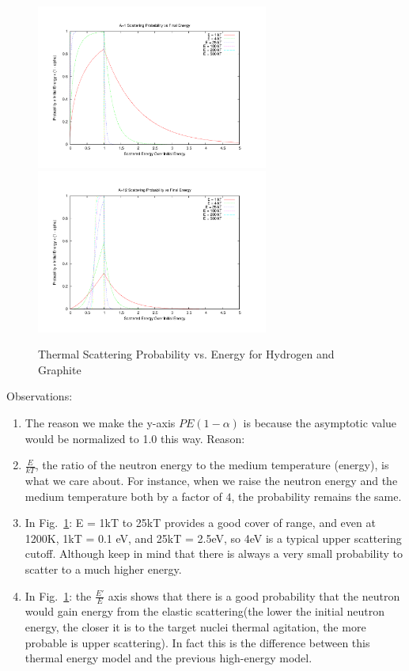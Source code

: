 \documentclass{school-22.211-notes}
\begin{document}
\begin{enumerate}
\begin{figure}[ht]
  \centering
  \includegraphics[width=3in]{images/sl-d/ts_H.uncrop.pdf}
  \includegraphics[width=3in]{images/sl-d/ts_C.uncrop.pdf}
  \caption{Thermal Scattering Probability vs. Energy for Hydrogen and Graphite} \label{ts-C-H}
\end{figure}
Observations: 
\begin{enumerate}
\item The reason we make the y-axis $P E (1-\alpha)$ is because the asymptotic value would be normalized to 1.0 this way. Reason: 

\item $\displaystyle \frac{E}{kT}$, the ratio of the neutron energy to the medium temperature (energy), is what we care about. For instance, when we raise the neutron energy and the medium temperature both by a factor of $4$, the probability remains the same. 

\item In Fig.~\ref{ts-C-H}: E = 1kT to 25kT provides a good cover of range, and even at 1200K, 1kT = 0.1 eV, and 25kT = 2.5eV, so 4eV is a typical upper scattering cutoff. Although keep in mind that there is always a very small probability to scatter to a much higher energy. 

\item In Fig.~\ref{ts-C-H}: the $\frac{E'}{E}$ axis shows that there is a good probability that the neutron would gain energy from the elastic scattering(the lower the initial neutron energy, the closer it is to the target nuclei thermal agitation, the more probable is upper scattering). In fact this is the difference between this thermal energy model and the previous high-energy model.  


\end{enumerate}
\end{enumerate}
\end{document}
